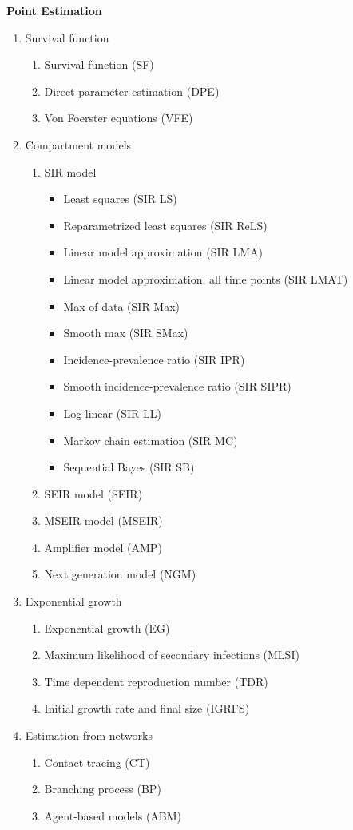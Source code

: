 \documentclass[12pt]{article}
\begin{document}
\textbf{Point Estimation}
\begin{enumerate}
\item Survival function
  \begin{enumerate}
  \item Survival function (SF)
  \item Direct parameter estimation (DPE)
  \item Von Foerster equations (VFE)

  \end{enumerate}
\item Compartment models 
  \begin{enumerate}
  \item SIR model
    \begin{itemize}
    \item Least squares (SIR LS)
    \item Reparametrized least squares (SIR ReLS)
    \item Linear model approximation (SIR LMA)
    \item Linear model approximation, all time points (SIR LMAT)
    \item Max of data (SIR Max)
    \item Smooth max (SIR SMax)
    \item Incidence-prevalence ratio (SIR IPR)
    \item Smooth incidence-prevalence ratio (SIR SIPR)
    \item Log-linear (SIR LL)
    \item Markov chain estimation (SIR MC)
    \item Sequential Bayes (SIR SB)
    \end{itemize}
  \item SEIR model (SEIR)
  \item MSEIR model (MSEIR)
  \item Amplifier model (AMP)
  \item Next generation model (NGM)
  \end{enumerate}
\item Exponential growth 
  \begin{enumerate}
  \item Exponential growth (EG)
  \item Maximum likelihood of secondary infections (MLSI)
  \item Time dependent reproduction number (TDR)
  \item Initial growth rate and final size  (IGRFS)
  \end{enumerate}
\item Estimation from networks 
  \begin{enumerate}
  \item Contact tracing (CT)
  \item Branching process (BP)
  \item Agent-based models (ABM)
  \end{enumerate}
  \end{enumerate}
\end{document}
